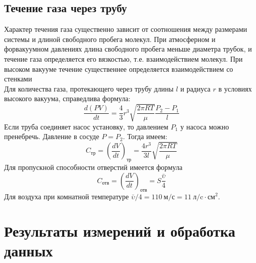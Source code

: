\documentclass{article}
\begin{document}
\subsection*{Течение газа через трубу}
Характер течения газа существенно зависит от соотношения между размерами системы и длиной свободного пробега молекул. При атмосферном и форвакуумном давлениях  длина свободного пробега меньше диаметра трубок, и течение газа определяется его вязкостью, т.е. взаимодействием молекул. При высоком вакууме течение существеннее определяется взаимодействием со стенками \\
Для количества газа, протекающего через трубу длины $l$ и радиуса $r$ в условиях высокого вакуума, справедлива формула:
\begin{equation}\label{eq55}
    \frac{d(PV)}{dt} = \frac{4}{3}r^3\sqrt{\frac{2\pi RT}{\mu}}\frac{P_2 - P_1}{l}
\end{equation}
Если труба соединяет насос установку, то давлением $P_1$ у насоса можно пренебречь. Давление в сосуде $P = P_2$. Тогда имеем:
\begin{equation}\label{eq6}
    C_\text{тр} = \left(\frac{dV}{dt}\right)_\text{тр} = \frac{4r^3}{3l}\sqrt{\frac{2\pi RT}{\mu}}
\end{equation}
Для пропускной способности отверстий имеется формула
\begin{equation}
    C_\text{отв} = \left(\frac{dV}{dt}\right)_\text{отв} = S\frac{\bar{\upsilon}}{4}
\end{equation}
Для воздуха при комнатной температуре $\bar{\upsilon}/4 = 110~\text{м/с} = 11~\text{л/c}\cdot\text{см}^2$.

\section*{Результаты измерений и обработка данных}
\end{document}
